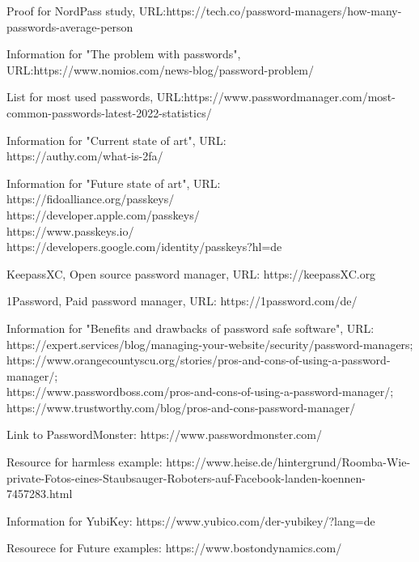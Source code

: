 \documentclass[conference]{IEEEtran}
\begin{document}
\begin{thebibliography}{00}
 Proof for NordPass study, URL:https://tech.co/password-managers/how-many-passwords-average-person


 Information for "The problem with passwords", URL:https://www.nomios.com/news-blog/password-problem/ 

 List for most used passwords, URL:https://www.passwordmanager.com/most-common-passwords-latest-2022-statistics/

 Information for "Current state of art", URL:\\ https://authy.com/what-is-2fa/

 Information for "Future state of art", URL:\\https://fidoalliance.org/passkeys/\\ https://developer.apple.com/passkeys/\\ https://www.passkeys.io/\\ https://developers.google.com/identity/passkeys?hl=de

 KeepassXC, Open source password manager, URL: https://keepassXC.org

 1Password, Paid password manager, URL: https://1password.com/de/

 Information for "Benefits and drawbacks of password safe software", URL: \\
https://expert.services/blog/managing-your-website/security/password-managers;\\ https://www.orangecountyscu.org/stories/pros-and-cons-of-using-a-password-manager/; \\ https://www.passwordboss.com/pros-and-cons-of-using-a-password-manager/; \\https://www.trustworthy.com/blog/pros-and-cons-password-manager/

 Link to PasswordMonster: https://www.passwordmonster.com/

 Resource for harmless example: https://www.heise.de/hintergrund/Roomba-Wie-private-Fotos-eines-Staubsauger-Roboters-auf-Facebook-landen-koennen-7457283.html

 Information for YubiKey: https://www.yubico.com/der-yubikey/?lang=de

 Resourece for Future examples: https://www.bostondynamics.com/

\end{thebibliography}
\end{document}
